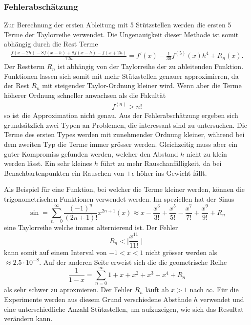 \subsubsection{Fehlerabschätzung}
Zur Berechnung der ersten Ableitung mit 5 Stützstellen werden die ersten 5 Terme der Taylorreihe verwendet. Die Ungenauigkeit dieser Methode ist somit abhängig durch die Rest Terme
\begin{align}
\frac{f(x-2h) - 8f(x-h) + 8f(x-h) - f(x+2h)}{12h} = f'(x) - \frac{1}{30} f^{(5)} (x)h^{4}+R_n(x) \text{.}
\label{ableitung:eqn:error}
\end{align}
Der Restterm $R_{n}$ ist abhängig von der Taylorreihe der zu ableitenden Funktion. Funktionen lassen sich somit mit mehr Stützstellen genauer approximieren, da der Rest $R_n$ mit steigender Taylor-Ordnung kleiner wird. Wenn aber die Terme höherer Ordnung schneller anwachsen als die Fakultät
\begin{align}
	f^{(n)} > n!
	\label{eqn:fakult}
\end{align}
so ist die Approximation nicht genau.
Aus der Fehlerabschätzung ergeben sich grundsätzlich zwei Typen an Problemen, die interessant sind zu untersuchen.
Die Terme des ersten Types werden mit zunehmender Ordnung kleiner, während bei dem zweiten Typ die Terme immer grösser werden.
Gleichzeitig muss aber ein guter Kompromiss gefunden werden, welcher den Abstand $h$ nicht zu klein werden lässt. Ein sehr kleines $h$ führt zu mehr Rauschanfälligkeit, da bei Benachbartenpunkten ein Rauschen von $\pm \epsilon$ höher ins Gewicht fällt.

Als Beispiel für eine Funktion, bei welcher die Terme kleiner werden, können die trigonometrischen Funktionen verwendet werden. Im speziellen hat der Sinus
\begin{equation}
	\sin = \sum _{n=0}^{\infty }{\frac {(-1)^{n}}{(2n+1)!}}x^{2n+1} \left(x\right)\approx x-{\frac {x^{3}}{3!}}+{\frac {x^{5}}{5!}}-{\frac {x^{7}}{7!}}+{\frac{x^9}{9!}}+R_n
\end{equation}
eine Taylorreihe welche immer alternierend ist. Der Fehler
\begin{equation}
R_n < \mid {\frac{x^{11}}{11!} \mid}
\end{equation}
kann somit auf einem Interval von $-1<x<1$ nicht grösser werden als $\approx 2.5 \cdot 10^{-8}$.
Auf der anderen Seite erweist sich die die geometrische Reihe
\begin{equation}
	\frac{1}{1-x} = \sum _{n=0}^{\infty} 1 + x + x^2 + x^3 + x^4 + R_n
\end{equation}
als sehr schwer zu aproxmieren. Der Fehler $R_n$ läuft ab $x>1$ nach $\infty$.
Für die Experimente werden aus diesem Grund verschiedene Abstände $h$ verwendet und eine unterschiedliche Anzahl Stützstellen, um aufzuzeigen, wie sich das Resultat verändern kann.
